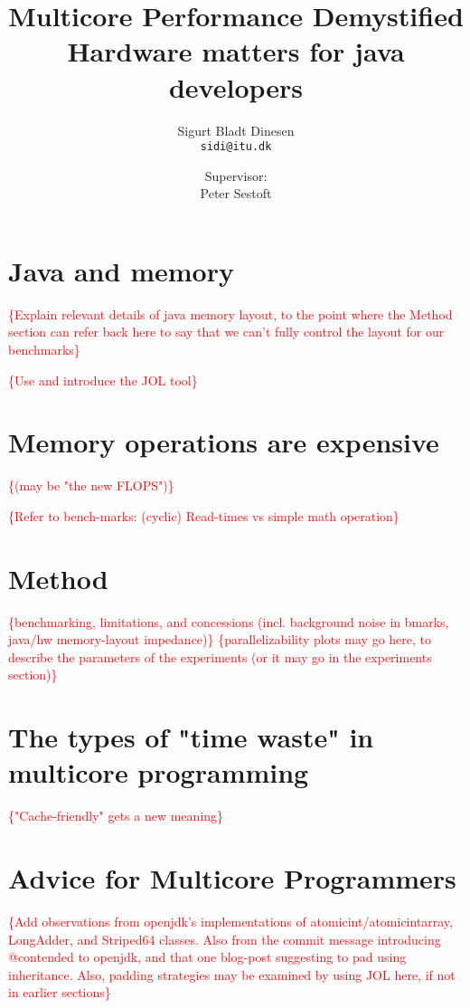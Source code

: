 \documentclass[a4paper, titlepage]{report}
\renewcommand{\%}{\protect\scalebox{.9}{\oldpct}}
\newcommand\mynote[1]{\noindent\textcolor{red}{\{#1\}}}
\begin{document}
\title{Multicore Performance Demystified\\
\hfill \break
\large Hardware matters for java developers
}
\author{
	Sigurt Bladt Dinesen
	\\\texttt{sidi@itu.dk}
	\and
	Supervisor:
	\\Peter Sestoft
}

\maketitle
\tableofcontents
\clearpage







\chapter{Java and memory}
\mynote{Explain relevant details of java memory layout, to the point where the
Method section can refer back here to say that we can't fully control the layout
for our benchmarks}

\mynote{Use and introduce the JOL tool}

\chapter{Memory operations are expensive}
\mynote{(may be "the new FLOPS")}

\mynote{Refer to bench-marks: (cyclic) Read-times vs simple math operation}

\chapter{Method}
\mynote{benchmarking, limitations, and concessions (incl. background
noise in bmarks, java/hw memory-layout impedance)}
\mynote{parallelizability plots may go here, to describe the parameters of the
experiments (or it may go in the experiments section)}

\chapter{The types of "time waste" in multicore programming}
\mynote{"Cache-friendly" gets a new meaning}



\chapter{Advice for Multicore Programmers}
\mynote{Add observations from openjdk's implementations of
atomicint/atomicintarray, LongAdder, and Striped64 classes. Also from the commit
message introducing @contended to openjdk, and that one blog-post suggesting to
pad using inheritance. Also, padding strategies may be examined by using JOL
here, if not in earlier sections}

\clearpage
\nocite{*}


\end{document}
